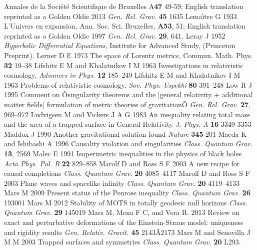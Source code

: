 \documentclass[12pt]{iopart}
\begin{document}
\begin{thebibliography}{999}
{Annales de la Soci\'et\'e Scientifique de Bruxelles} A{\bf 47} 49-59; English translation reprinted as a Golden Oldie 2013 {\it Gen. Rel. Grav.} {\bf 45} 1635%
 Lema\^{\i}tre G 1933 L'Univers en expansion, Ann. Soc. Sci. Bruxelles, {\bf A53}, 51; English translation reprinted as a Golden Oldie 1997 {\it Gen. Rel. Grav.} {\bf 29}, 641.
 Leray J 1952 {\it Hyperbolic Differential Equations},
Institute for Advanced Study, (Princeton Preprint).%
 Lerner D E 1973 The space of Lorentz metrics, Commun. Math. Phys. {\bf 32} 19--38
 Lifshitz E M and Khalatnikov I M 1963 Investigations in relativistic cosmology, {\it Advances in Phys.} {\bf 12} 185--249
 Lifshitz E M and Khalatnikov I M 1963 Problems of relativistic cosmology, {\it Sov. Phys. Uspekhi} {\bf 80} 391--248
 Low R J 1995 Comment on Ôsingularity theorems and the [general relativity + additional matter fields] formulation of metric theories of gravitationÕ {\it Gen. Rel. Grav.} {\bf 27}, 969--972%
 Ludvigsen M and Vickers J A G 1983 An inequality relating total mass and the area of a trapped surface in General Relativity {\it J. Phys. A} {\bf 16} 3349-3353
 Maddox J 1990 Another gravitational 
solution found {\it Nature} {\bf 345} 201
 Maeda K and Ishibashi A 1996 Causality violation and singularities {\it Class. Quantum Grav.} {\bf 13},
2569%
 Malec E 1991 Isoperimetric inequalities in the physics of black holes {\it Acta Phys. Pol. B} {\bf 22} 829--858
 Marolf D and Ross S F 2003 A new recipe for causal completions {\it Class. Quantum Grav.} {\bf 20} 4085--4117
 Marolf D and Ross S F 2003 Plane waves and spacelike infinity {\it Class. Quantum Grav.} {\bf 20} 4119--4133
 Mars M 2009 Present status of the Penrose inequality {\it Class. Quantum Grav.} {\bf 26} 193001
 Mars M 2012 Stability of MOTS in totally geodesic null horizons {\it Class. Quantum Grav.} {\bf 29} 145019
 Mars M, Mena F C, and Vera R. 2013 Review on exact and perturbative deformations
of the Einstein-Straus model: uniqueness and rigidity results {\it Gen. Relativ. Gravit.} {\bf 45} 2143Ã2173
 Mars M and Senovilla J M M 2003 Trapped surfaces and symmetries {\it Class. Quantum Grav.}  {\bf 20} L293.

\end{thebibliography}
\end{document}
